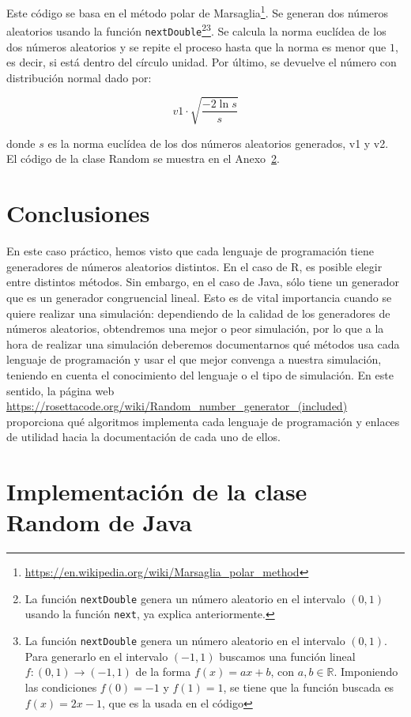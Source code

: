 \documentclass[12pt,a4paper,twoside,openright,titlepage,final]{article}
\begin{document}
Este código se basa en el método polar de Marsaglia\footnote{\url{https://en.wikipedia.org/wiki/Marsaglia_polar_method}}. Se generan dos números aleatorios usando la función \texttt{nextDouble}\footnote{La función \texttt{nextDouble} genera un número aleatorio en el intervalo $(0,1)$ usando la función \texttt{next}, ya explica anteriormente.}\footnote{La función \texttt{nextDouble} genera un número aleatorio en el intervalo $(0,1)$. Para generarlo en el intervalo $(-1,1)$ buscamos una función lineal $f: (0,1) \to (-1,1)$ de la forma $f(x) = ax + b$, con $a,b \in \mathbb{R}$. Imponiendo las condiciones $f(0)= -1$ y $f(1) = 1$, se tiene que la función buscada es $f(x) = 2x-1$, que es la usada en el código}. Se calcula la norma euclídea de los dos números aleatorios y se repite el proceso hasta que la norma es menor que $1$, es decir, si está dentro del círculo unidad. Por último, se devuelve el número con distribución normal dado por:

\[ v1 \cdot \sqrt{\dfrac{-2 \ln s}{s}} \]

donde $s$ es la norma euclídea de los dos números aleatorios generados, v1 y v2.\\

El código de la clase Random se muestra en el Anexo~\ref{app:Random}.

\section{Conclusiones}

En este caso práctico, hemos visto que cada lenguaje de programación tiene generadores de números aleatorios distintos. En el caso de R, es posible elegir entre distintos métodos. Sin embargo, en el caso de Java, sólo tiene un generador que es un generador congruencial lineal. Esto es de vital importancia cuando se quiere realizar una simulación: dependiendo de la calidad de los generadores de números aleatorios, obtendremos una mejor o peor simulación, por lo que a la hora de realizar una simulación deberemos documentarnos qué métodos usa cada lenguaje de programación y usar el que mejor convenga a nuestra simulación, teniendo en cuenta el conocimiento del lenguaje o el tipo de simulación. En este sentido, la página web \url{https://rosettacode.org/wiki/Random_number_generator_(included)} proporciona qué algoritmos implementa cada lenguaje de programación y enlaces de utilidad hacia la documentación de cada uno de ellos.  

\newpage
\appendix
\section{Implementación de la clase Random de Java}\label{app:Random}
\end{document}
